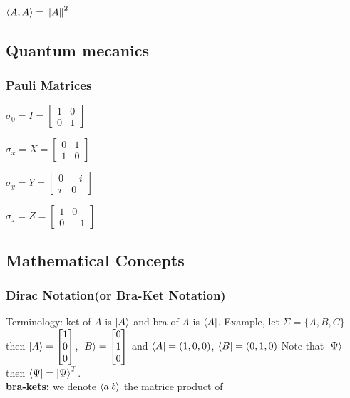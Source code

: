 \documentclass[5pt]{article}
\begin{document}
\begin{multicols}{3}
\begin{properties}
     $\langle A,A\rangle=\norm{A}^2$\\
\end{properties}




\subsection{Quantum mecanics}
\subsubsection{Pauli Matrices}
\begin{itemize*}
     \item $\sigma_0 = I = \begin{bmatrix}1 & 0 \\ 0 & 1\end{bmatrix}$
     \item $\sigma_x = X = \begin{bmatrix}0 & 1 \\ 1 & 0\end{bmatrix}$
     \item $\sigma_y = Y = \begin{bmatrix}0 & -i \\ i & 0\end{bmatrix}$
     \item $\sigma_z = Z = \begin{bmatrix}1 & 0 \\ 0 & -1\end{bmatrix}$
\end{itemize*}




\newpage





\subsection{Mathematical Concepts}

\subsubsection{Dirac Notation\footnotesize{(or Bra-Ket Notation)}}
Terminology: ket of $A$ is $\ket{A}$ and bra of $A$ is $\bra{A}$.
Example, let $\Sigma=\{A,B,C\}$ then $\ket{A}=\begin{bmatrix}1\\0\\0 \end{bmatrix}$, $\ket{B}=\begin{bmatrix}0\\1\\0 \end{bmatrix}$
and $\bra{A}=(1,0,0)$, $\bra{B}=(0,1,0)$
Note that $\ket{\Psi}$ then $\bra{\Psi}=\ket{\Psi}^T$.\\
\textbf{bra-kets:} we denote $\braket{a}{b}$ the matrice product of 



\end{multicols}
\end{document}

